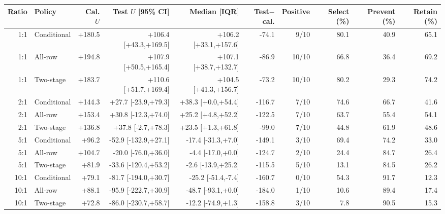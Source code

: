 \begin{tabular}{rlrrrrrrrr}
\toprule
Ratio & Policy & Cal. $U$ & Test $U$ [95\% CI] & Median [IQR] & Test$-$cal. & Positive & Select (\%) & Prevent (\%) & Retain (\%) \\
\midrule
1:1 & Conditional & +180.5 & +106.4 [+43.3,+169.5] & +106.2 [+33.1,+157.6] & -74.1 & 9/10 & 80.1 & 40.9 & 65.1 \\
1:1 & All-row & +194.8 & +107.9 [+50.5,+165.4] & +107.1 [+38.7,+132.7] & -86.9 & 10/10 & 66.8 & 36.4 & 69.2 \\
1:1 & Two-stage & +183.7 & +110.6 [+51.7,+169.4] & +104.5 [+41.3,+156.7] & -73.2 & 10/10 & 80.2 & 29.3 & 74.2 \\
2:1 & Conditional & +144.3 & +27.7 [-23.9,+79.3] & +38.3 [+0.0,+54.4] & -116.7 & 7/10 & 74.6 & 66.7 & 41.6 \\
2:1 & All-row & +153.4 & +30.8 [-12.3,+74.0] & +25.2 [+4.8,+52.2] & -122.5 & 7/10 & 63.7 & 55.4 & 54.1 \\
2:1 & Two-stage & +136.8 & +37.8 [-2.7,+78.3] & +23.5 [+1.3,+61.8] & -99.0 & 7/10 & 44.8 & 61.9 & 48.6 \\
5:1 & Conditional & +96.2 & -52.9 [-132.9,+27.1] & -17.4 [-31.3,+7.0] & -149.1 & 3/10 & 69.4 & 74.2 & 33.0 \\
5:1 & All-row & +104.7 & -20.0 [-76.0,+36.0] & -4.4 [-17.0,+0.0] & -124.7 & 2/10 & 24.4 & 84.7 & 26.4 \\
5:1 & Two-stage & +81.9 & -33.6 [-120.4,+53.2] & -2.6 [-13.9,+25.2] & -115.5 & 5/10 & 13.1 & 84.5 & 26.2 \\
10:1 & Conditional & +79.1 & -81.7 [-194.0,+30.7] & -25.2 [-51.4,-7.4] & -160.7 & 0/10 & 54.3 & 91.7 & 12.3 \\
10:1 & All-row & +88.1 & -95.9 [-222.7,+30.9] & -48.7 [-93.1,+0.0] & -184.0 & 1/10 & 10.6 & 89.4 & 17.4 \\
10:1 & Two-stage & +72.8 & -86.0 [-230.7,+58.7] & -12.2 [-74.9,+1.3] & -158.8 & 3/10 & 7.8 & 90.5 & 15.3 \\
\bottomrule
\end{tabular}
